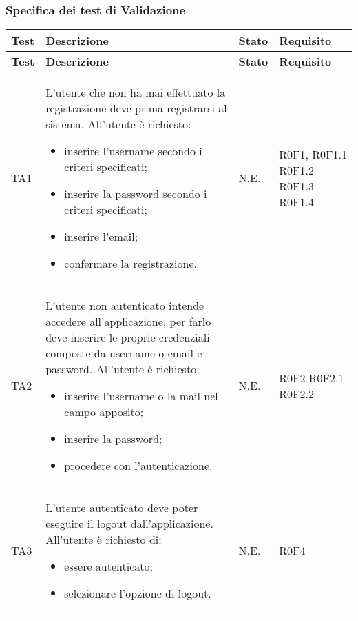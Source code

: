 \subsubsection{Specifica dei test di Validazione}
\begin{longtable}{p{2cm}!{\VRule[1pt]}p{7cm}!{\VRule[1pt]}p{1.5cm}!{\VRule[1pt]}p{2.5cm}}
\color{white} \textbf{Test} & \color{white} \textbf{Descrizione}  & \color{white} \textbf{Stato}  & \color{white} \textbf{Requisito}\\ 
\endfirsthead 
{} 
\color{white} \textbf{Test} & \color{white} \textbf{Descrizione}  & \color{white} \textbf{Stato}  & \color{white} \textbf{Requisito}\\  
\endhead 
TA1 & L'utente che non ha mai effettuato la registrazione deve prima registrarsi al sistema. All'utente è richiesto: \begin{itemize}
\item inserire l'username secondo i criteri specificati;
\item inserire la password secondo i criteri specificati;
\item inserire l'email;
\item confermare la registrazione.
\end{itemize} & N.E. & R0F1, R0F1.1 \newline R0F1.2 R0F1.3 \newline R0F1.4\\

TA2 & L'utente non autenticato intende accedere all'applicazione, per farlo deve inserire le proprie credenziali composte da username o email e password. All'utente è richiesto: \begin{itemize}
\item inserire l'username o la mail nel campo apposito;
\item inserire la password;
\item procedere con l'autenticazione.
\end{itemize} & N.E. & R0F2 R0F2.1 \newline R0F2.2\\

TA3 & L'utente autenticato deve poter eseguire il logout dall'applicazione. All'utente è richiesto di:\begin{itemize}
\item essere autenticato;
\item selezionare l'opzione di logout.
\end{itemize} & N.E. & R0F4\\


\end{longtable}
